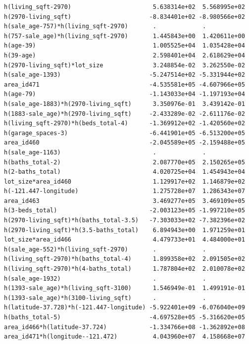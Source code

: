 \documentclass[
]{article}
\begin{document}
\begin{verbatim}
h(living_sqft-2970)                       5.638314e+02  5.568995e+02
h(2970-living_sqft)                      -8.834401e+02 -8.980566e+02
h(sale_age-757)*h(living_sqft-2970)       .             .           
h(757-sale_age)*h(living_sqft-2970)       1.445843e+00  1.420611e+00
h(age-39)                                 1.005525e+04  1.035428e+04
h(39-age)                                 2.598401e+04  2.618629e+04
h(2970-living_sqft)*lot_size              3.248854e-02  3.262550e-02
h(sale_age-1393)                         -5.247514e+02 -5.331944e+02
area_id471                               -4.535581e+05 -4.607966e+05
h(age-79)                                -1.143033e+04 -1.197193e+04
h(sale_age-1883)*h(2970-living_sqft)      3.350976e-01  3.439142e-01
h(1883-sale_age)*h(2970-living_sqft)     -2.433289e-02 -2.611176e-02
h(living_sqft-2970)*h(beds_total-4)      -1.369912e+02 -1.420560e+02
h(garage_spaces-3)                       -6.441901e+05 -6.513200e+05
area_id460                               -2.045589e+05 -2.159488e+05
h(sale_age-1163)                          .             .           
h(baths_total-2)                          2.087770e+05  2.150265e+05
h(2-baths_total)                          4.020725e+04  1.454943e+04
lot_size*area_id460                       1.129917e+02  1.146879e+02
h(-121.447-longitude)                     1.275728e+07  1.286343e+07
area_id463                                3.469277e+05  3.469109e+05
h(3-beds_total)                          -2.003123e+05 -1.997210e+05
h(2970-living_sqft)*h(baths_total-3.5)   -7.303033e+02 -7.382396e+02
h(2970-living_sqft)*h(3.5-baths_total)    6.894943e+00  1.971259e+01
lot_size*area_id466                       4.479733e+01  4.484000e+01
h(sale_age-552)*h(living_sqft-2970)       .             .           
h(living_sqft-2970)*h(baths_total-4)      1.899358e+02  2.091505e+02
h(living_sqft-2970)*h(4-baths_total)      1.787804e+02  2.010078e+02
h(sale_age-1932)                          .             .           
h(1393-sale_age)*h(living_sqft-3100)      1.546949e-01  1.499191e-01
h(1393-sale_age)*h(3100-living_sqft)      .             .           
h(latitude-37.728)*h(-121.447-longitude) -5.922401e+09 -6.076040e+09
h(baths_total-5)                         -4.697528e+05 -5.316620e+05
area_id466*h(latitude-37.724)            -1.334766e+08 -1.362892e+08
area_id471*h(longitude--121.472)          4.043960e+07  4.158668e+07
                                                                    

\end{verbatim}
\end{document}

